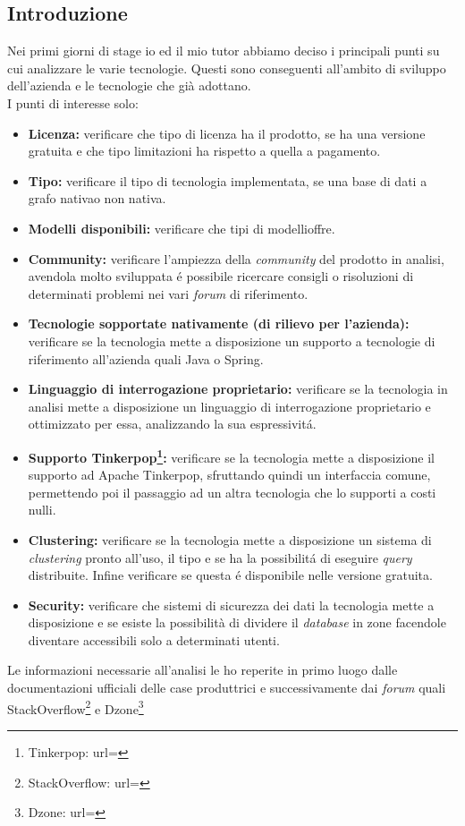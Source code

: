 \subsection{Introduzione}
Nei primi giorni di stage io ed il mio tutor abbiamo deciso i principali punti su cui analizzare le varie tecnologie. Questi sono conseguenti all'ambito di sviluppo dell'azienda e le tecnologie che già adottano.\\
I punti di interesse solo:
\begin{itemize}
\item{\textbf{Licenza:}} verificare che tipo di licenza ha il prodotto, se ha una versione gratuita e che tipo limitazioni ha rispetto a quella a pagamento.
\item{\textbf{Tipo:}} verificare il tipo di tecnologia implementata, se una base di dati a grafo nativa\glsfirstoccur o non nativa\glsfirstoccur.
\item{\textbf{Modelli disponibili:}} verificare che tipi di modelli\glsfirstoccur offre.
\item{\textbf{Community:}} verificare l'ampiezza della \textit{community} del prodotto in analisi, avendola molto sviluppata é possibile ricercare consigli o risoluzioni di determinati problemi nei vari \textit{forum} di riferimento.
\item{\textbf{Tecnologie sopportate nativamente (di rilievo per l'azienda):}} verificare se la tecnologia mette a disposizione un supporto a tecnologie di riferimento all'azienda quali Java o Spring.
\item{\textbf{Linguaggio di interrogazione proprietario:}} verificare se la tecnologia in analisi mette a disposizione un linguaggio di interrogazione proprietario e ottimizzato per essa, analizzando la sua espressivitá.
\item{\textbf{Supporto Tinkerpop\footnote{Tinkerpop: url= }:}} verificare se la tecnologia mette a disposizione il supporto ad Apache Tinkerpop, sfruttando quindi un interfaccia comune, permettendo poi il passaggio ad un altra tecnologia che lo supporti a costi nulli.
\item{\textbf{Clustering\glsfirstoccur:}} verificare se la tecnologia mette a disposizione un sistema di \textit{clustering} pronto all'uso, il tipo e se ha la possibilitá di eseguire \textit{query} distribuite. Infine verificare se questa é disponibile nelle versione gratuita.
\item{\textbf{Security:}} verificare che sistemi di sicurezza dei dati la tecnologia mette a disposizione e se esiste la possibilità di dividere il \textit{database} in zone facendole diventare accessibili solo a determinati utenti.\\

\end{itemize}
Le informazioni necessarie all'analisi le ho reperite in primo luogo dalle documentazioni ufficiali delle case produttrici e successivamente dai \textit{forum} quali StackOverflow\footnote{StackOverflow: url= } e Dzone\footnote{Dzone: url= }
